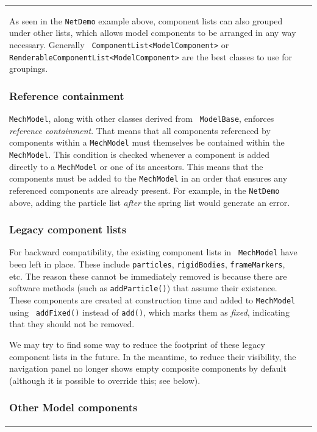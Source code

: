 \documentclass{article}
\begin{document}
\begin{tabular}{ll}
As seen in the {\tt NetDemo} example above, component lists can also
grouped under other lists, which allows model components to be
arranged in any way necessary.  Generally {\tt
ComponentList<ModelComponent>} or {\tt
RenderableComponentList<ModelComponent>} are the best classes to use
for groupings.

\subsubsection*{Reference containment}

{\tt MechModel}, along with other classes derived from {\tt
ModelBase}, enforces {\it reference containment}. That means that all
components referenced by components within a {\tt MechModel} must
themselves be contained within the {\tt MechModel}.  This condition is
checked whenever a component is added directly to a {\tt MechModel} or
one of its ancestors. This means that the components must be added to
the {\tt MechModel} in an order that ensures any referenced components are
already present. For example, in the {\tt NetDemo} above, adding the
particle list {\it after} the spring list would generate an error.

\subsubsection*{Legacy component lists}

For backward compatibility, the existing component lists in {\tt
MechModel} have been left in place. These include {\tt particles},
{\tt rigidBodies}, {\tt frameMarkers}, etc. The reason these cannot be
immediately removed is because there are software methods (such as
{\tt addParticle()}) that assume their existence. These components are
created at construction time and added to {\tt MechModel} using {\tt
addFixed()} instead of {\tt add()}, which marks them as {\it fixed},
indicating that they should not be removed.

We may try to find some way to reduce the footprint of these legacy
component lists in the future. In the meantime, to reduce their
visibility, the navigation panel no longer shows empty composite
components by default (although it is possible to override this; see
below).

\subsubsection*{Other Model components}


\end{tabular}
\end{document}
